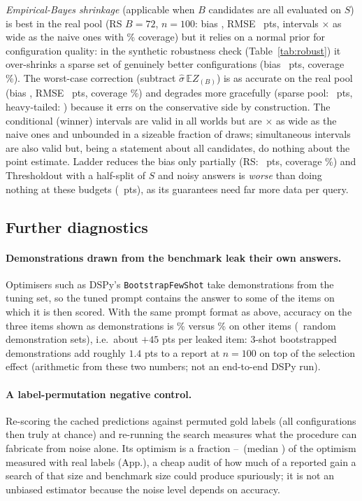 \emph{Empirical-Bayes shrinkage} (applicable when $B$ candidates are all evaluated on $S$) is best in the real pool (RS $B{=}72$, $n{=}100$: bias \EBBias, RMSE \EBRmse\ pts, intervals \EBWidthRatio$\times$ as wide as the naive ones with \EBCov\% coverage) but it relies on a normal prior for configuration quality: in the synthetic robustness check (Table~\ref{tab:robust}) it over-shrinks a sparse set of genuinely better configurations (bias \RobSparseEBBias\ pts, coverage \RobSparseEBCov\%). The worst-case correction (subtract $\hat\sigma\,\mathbb{E}Z_{(B)}$) is as accurate on the real pool (bias \WorstBias, RMSE \WorstRmse\ pts, coverage \WorstCov\%) and degrades more gracefully (sparse pool: \RobSparseWorstBias\ pts, heavy-tailed: \RobHeavyWorstBias) because it errs on the conservative side by construction. The conditional (winner) intervals are valid in all worlds but are \CondWidthRatio$\times$ as wide as the naive ones and unbounded in a sizeable fraction of draws; simultaneous intervals are also valid but, being a statement about all candidates, do nothing about the point estimate. Ladder reduces the bias only partially (RS: \LadderBias\ pts, coverage \LadderCov\%) and Thresholdout with a half-split of $S$ and noisy answers is \emph{worse} than doing nothing at these budgets (\ThoBias\ pts), as its guarantees need far more data per query.

\subsection{Further diagnostics}
\paragraph{Demonstrations drawn from the benchmark leak their own answers.}
Optimisers such as DSPy's \texttt{BootstrapFewShot} take demonstrations from the tuning set, so the tuned prompt contains the answer to some of the items on which it is then scored. With the same prompt format as above, accuracy on the three items shown as demonstrations is \LeakIn\% versus \LeakOut\% on other items (\LeakSets\ random demonstration sets), i.e.\ about $+45$ pts per leaked item: $3$-shot bootstrapped demonstrations add roughly $1.4$ pts to a report at $n{=}100$ on top of the selection effect (arithmetic from these two numbers; not an end-to-end DSPy run).
\paragraph{A label-permutation negative control.} Re-scoring the cached predictions against permuted gold labels (all configurations then truly at chance) and re-running the search measures what the procedure can fabricate from noise alone. Its optimism is a fraction \PermRatioMin--\PermRatioMax\ (median \PermRatioMed) of the optimism measured with real labels (App.), a cheap audit of how much of a reported gain a search of that size and benchmark size could produce spuriously; it is not an unbiased estimator because the noise level depends on accuracy.
